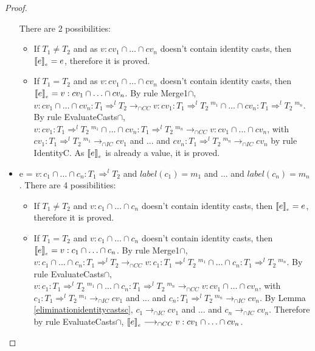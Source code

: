\documentclass[a4paper]{article}
\begin{document}
\begin{proof}
\begin{itemize}
    There are 2 possibilities:
    \begin{itemize}
        \item If $T_1 \neq T_2$ and as $v : cv_1 \cap \ldots \cap cv_n$ doesn't contain identity casts, then $\llbracket e \rrbracket_{_e} = e$, therefore it is proved.
        \item If $T_1 = T_2$ and as $v : cv_1 \cap \ldots \cap cv_n$ doesn't contain identity casts, then $\llbracket e \rrbracket_{_e} = v : cv_1 \cap \ldots \cap cv_n$.
        By rule Merge1$\cap$, $v : cv_1 \cap \ldots \cap cv_n : T_1 \Rightarrow^l T_2 \longrightarrow_{\cap CC} v : cv_1 : T_1 \Rightarrow^l T_2\ ^{m_1} \cap \ldots \cap cv_n : T_1 \Rightarrow^l T_2\ ^{m_n}$.
        By rule EvaluateCasts$\cap$, $v : cv_1 : T_1 \Rightarrow^l T_2\ ^{m_1} \cap \ldots \cap cv_n : T_1 \Rightarrow^l T_2\ ^{m_n} \longrightarrow_{\cap CC} v : cv_1 \cap \ldots \cap cv_n$, with $cv_1 : T_1 \Rightarrow^l T_2\ ^{m_1} \longrightarrow_{\cap IC} cv_1$ and ... and $cv_n : T_1 \Rightarrow^l T_2\ ^{m_n} \longrightarrow_{\cap IC} cv_n$ by rule IdentityC.
        As $\llbracket e \rrbracket_{_e}$ is already a value, it is proved.
    \end{itemize}
    \iffalse
    \item e = $v : c_1 \cap \ldots \cap c_n : T_1 \Rightarrow^l T_2$ and $label(c_1) = m_1$ and ... and $label(c_n) = m_n$.
    There are 4 possibilities:
    \begin{itemize}
        \item If $T_1 \neq T_2$ and $v : c_1 \cap \ldots \cap c_n$ doesn't contain identity casts, then $\llbracket e \rrbracket_{_e} = e$, therefore it is proved.
        \item If $T_1 = T_2$ and $v : c_1 \cap \ldots \cap c_n$ doesn't contain identity casts, then $\llbracket e \rrbracket_{_e} = v : c_1 \cap \ldots \cap c_n$.
        By rule Merge1$\cap$, $v : c_1 \cap \ldots \cap c_n : T_1 \Rightarrow^l T_2 \longrightarrow_{\cap CC} v : c_1 : T_1 \Rightarrow^l T_2\ ^{m_1} \cap \ldots \cap c_n : T_1 \Rightarrow^l T_2\ ^{m_n}$.
        By rule EvaluateCasts$\cap$, $v : c_1 : T_1 \Rightarrow^l T_2\ ^{m_1} \cap \ldots \cap c_n : T_1 \Rightarrow^l T_2\ ^{m_n} \longrightarrow_{\cap CC} v : cv_1 \cap \ldots \cap cv_n$, with $c_1 : T_1 \Rightarrow^l T_2\ ^{m_1} \longrightarrow_{\cap IC} cv_1$ and ... and $c_n : T_1 \Rightarrow^l T_2\ ^{m_n} \longrightarrow_{\cap IC} cv_n$.
        By Lemma \ref{eliminationidentitycastsc}, $c_1 \longrightarrow_{\cap IC} cv_1$ and ... and $c_n \longrightarrow_{\cap IC} cv_n$.
        Therefore by rule EvaluateCasts$\cap$, $\llbracket e \rrbracket_{_e} \longrightarrow_{\cap CC} v : cv_1 \cap \ldots \cap cv_n$.

\end{itemize}
\end{itemize}
\end{proof}
\end{document}

